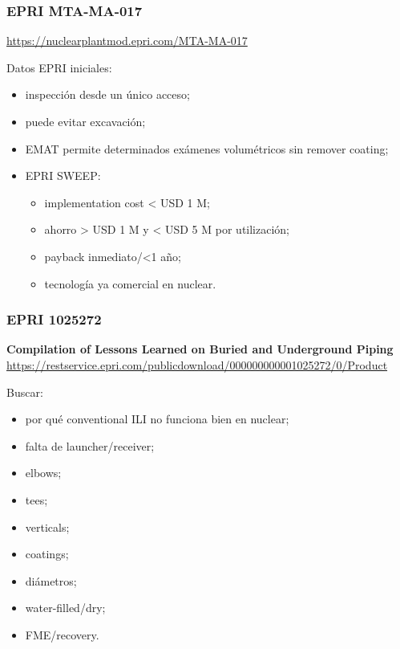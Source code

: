 \documentclass[11pt,a4paper]{article}
\begin{document}
\subsubsection*{EPRI MTA-MA-017}
\url{https://nuclearplantmod.epri.com/MTA-MA-017}

Datos EPRI iniciales:

\begin{itemize}
\item inspección desde un único acceso;
\item puede evitar excavación;
\item EMAT permite determinados exámenes volumétricos sin remover coating;
\item EPRI SWEEP:
\begin{itemize}
\item implementation cost \textless{} USD 1 M;
\item ahorro \textgreater{} USD 1 M y \textless{} USD 5 M por utilización;
\item payback inmediato/\textless{}1 año;
\item tecnología ya comercial en nuclear.
\end{itemize}
\end{itemize}


\subsubsection*{EPRI 1025272}
\textbf{Compilation of Lessons Learned on Buried and Underground Piping} \\
\url{https://restservice.epri.com/publicdownload/000000000001025272/0/Product}

Buscar:

\begin{itemize}
\item por qué conventional ILI no funciona bien en nuclear;
\item falta de launcher/receiver;
\item elbows;
\item tees;
\item verticals;
\item coatings;
\item diámetros;
\item water-filled/dry;
\item FME/recovery.
\end{itemize}
\end{document}
